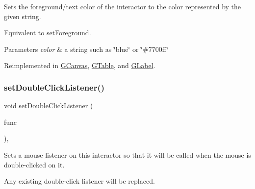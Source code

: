 Sets the foreground/text color of the interactor to the color represented by the given string. 

Equivalent to set\+Foreground. 
\begin{DoxyParams}{Parameters}
{\em color} & a string such as \char`\"{}blue\char`\"{} or \char`\"{}\#7700ff\char`\"{} \\
\hline
\end{DoxyParams}


Reimplemented in \mbox{\hyperlink{classsgl_1_1GCanvas_a56845b1accc47aa881d05939eef6996c}{G\+Canvas}}, \mbox{\hyperlink{classsgl_1_1GTable_a56845b1accc47aa881d05939eef6996c}{G\+Table}}, and \mbox{\hyperlink{classsgl_1_1GLabel_a56845b1accc47aa881d05939eef6996c}{G\+Label}}.

\mbox{\label{classsgl_1_1GInteractor_ac29f9a3462458e165fae3a1f046ee77a}} 
\subsubsection{\texorpdfstring{set\+Double\+Click\+Listener()}{setDoubleClickListener()}\hspace{0.1cm}{\footnotesize\ttfamily [1/2]}}
{\footnotesize\ttfamily void set\+Double\+Click\+Listener (\begin{DoxyParamCaption}\item[{\mbox{\hyperlink{namespacesgl_ae9f3e9eab70035da1a2b114e21357b25}{G\+Event\+Listener}}}]{func }\end{DoxyParamCaption})\hspace{0.3cm}{\ttfamily [virtual]}, {\ttfamily [inherited]}}



Sets a mouse listener on this interactor so that it will be called when the mouse is double-\/clicked on it. 

Any existing double-\/click listener will be replaced. \mbox{\label{classsgl_1_1GInteractor_a50096194d66f48c92dd4c512d41bfc76}} 
